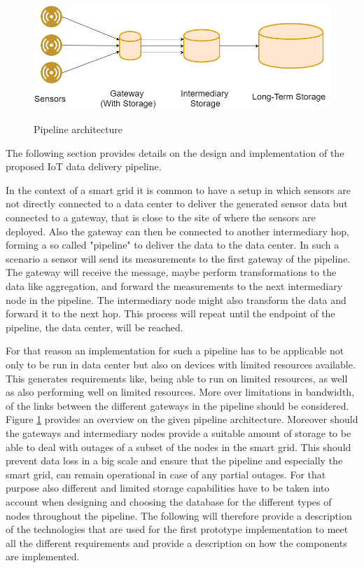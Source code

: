 

\begin{figure}[h]
\centering
\includegraphics[width=\textwidth]{figures/pipeline.png}\\
\caption{Pipeline architecture}
\label{pipeline}
\end{figure}
The following section provides details on the design and implementation of the proposed IoT data delivery pipeline. 

In the context of a smart grid it is common to have a setup in which sensors are not directly connected to a data center to deliver the generated sensor data but connected to a gateway, that is close to the site of where the sensors are deployed. Also the gateway can then be connected to another intermediary hop, forming a so called "pipeline" to deliver the data to the data center. In such a scenario a sensor will send its measurements to the first gateway of the pipeline. The gateway will receive the message, maybe perform transformations to the data like aggregation, and forward the measurements to the next intermediary node in the pipeline. The intermediary node might also transform the data and forward it to the next hop. This process will repeat until the endpoint of the pipeline, the data center, will be reached. 

For that reason an implementation for such a pipeline has to be applicable not only to be run in data center but also on devices with limited resources available. This generates requirements like, being able to run on limited resources, as well as also performing well on limited resources. More over limitations in bandwidth, of the links between the different gateways in the pipeline should be considered.
Figure \ref{pipeline} provides an overview on the given pipeline architecture. Moreover should the gateways and intermediary nodes provide a suitable amount of storage to be able to deal with outages of a subset of the nodes in the smart grid. This should prevent data loss in a big scale and ensure that the pipeline and especially the smart grid, can remain operational in case of any partial outages. For that purpose also different and limited storage capabilities have to be taken into account when designing and choosing the database for the different types of nodes throughout the pipeline. The following will therefore provide a description of the technologies that are used for the first prototype implementation to meet all the different requirements and provide a description on how the components are implemented.



